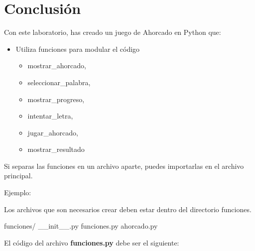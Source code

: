 \documentclass[
  a4paper,
  DIV=11,
  numbers=noendperiod,
  onepage,
  openany]{scrreprt}
\newenvironment{Shaded}{\begin{snugshade}}{\end{snugshade}}
\newcommand{\ExtensionTok}[1]{\textcolor[rgb]{0.00,0.23,0.31}{#1}}
\providecommand{\tightlist}{%
  \setlength{\itemsep}{0pt}\setlength{\parskip}{0pt}}\usepackage{longtable,booktabs,array}
\begin{document}
\chapter{Conclusión}\label{conclusiuxf3n-2}

Con este laboratorio, has creado un juego de Ahorcado en Python que:

\begin{itemize}
\item
  Utiliza funciones para modular el código

  \begin{itemize}
  \tightlist
  \item
    mostrar\_ahorcado,
  \item
    seleccionar\_palabra,
  \item
    mostrar\_progreso,
  \item
    intentar\_letra,
  \item
    jugar\_ahorcado,
  \item
    mostrar\_resultado
  \end{itemize}
\end{itemize}

Si separas las funciones en un archivo aparte, puedes importarlas en el
archivo principal.

Ejemplo:

Los archivos que son necesarios crear deben estar dentro del directorio
funciones.

\begin{Shaded}
\begin{Highlighting}[]
\ExtensionTok{funciones/}
    \ExtensionTok{\_\_init\_\_.py}
    \ExtensionTok{funciones.py}
\ExtensionTok{ahorcado.py}
\end{Highlighting}
\end{Shaded}

El código del archivo \textbf{funciones.py} debe ser el siguiente:
\end{document}
